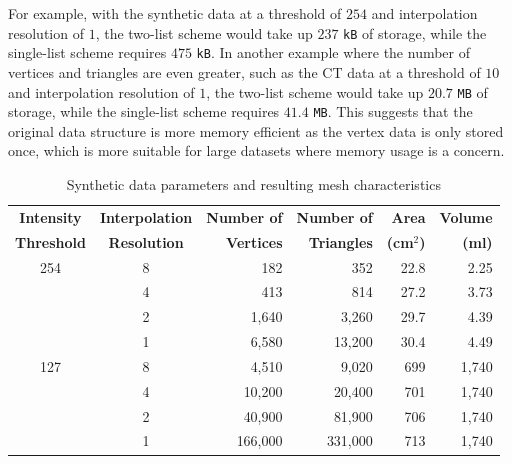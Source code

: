 \documentclass[11pt, twocolumn]{article}
\begin{document}
For example, with the synthetic data at a threshold of $254$ and interpolation resolution of $1$, the two-list scheme would take up $237$ \texttt{kB} of storage, while the single-list scheme requires $475$ \texttt{kB}. 
In another example where the number of vertices and triangles are even greater, such as the CT data at a threshold of $10$ and interpolation resolution of $1$, the two-list scheme would take up $20.7$ \texttt{MB} of storage, while the single-list scheme requires $41.4$ \texttt{MB}. This suggests that the original data structure is more memory efficient as the vertex data is only stored once, which is more suitable for large datasets where memory usage is a concern.

\begin{table}[ht]
    \centering
    \caption{Synthetic data parameters and resulting mesh characteristics}
    \label{tab:synthetic-data}
    \begin{tabular*}{\textwidth}{@{\extracolsep{\fill}}ccrrrr@{}}
    \hline
    \textbf{Intensity} & \textbf{Interpolation} & \textbf{Number of} & \textbf{Number of} & \textbf{Area} & \textbf{Volume} \\
    \textbf{Threshold} & \textbf{Resolution} & \textbf{Vertices} & \textbf{Triangles} & \textbf{(cm$^2$)} & \textbf{(ml)} \\
    \hline
    254 & 8 & 182 & 352 & 22.8 & 2.25 \\
     & 4 & 413 & 814 & 27.2 & 3.73 \\
     & 2 & 1,640 & 3,260 & 29.7 & 4.39 \\
     & 1 & 6,580 & 13,200 & 30.4 & 4.49 \\
    \hline
    127 & 8 & 4,510 & 9,020 & 699 & 1,740 \\
     & 4 & 10,200 & 20,400 & 701 & 1,740 \\
     & 2 & 40,900 & 81,900 & 706 & 1,740 \\
     & 1 & 166,000 & 331,000 & 713 & 1,740 \\
    \hline
    \end{tabular*}

    \vspace{1cm}
    

\end{table}
\end{document}
